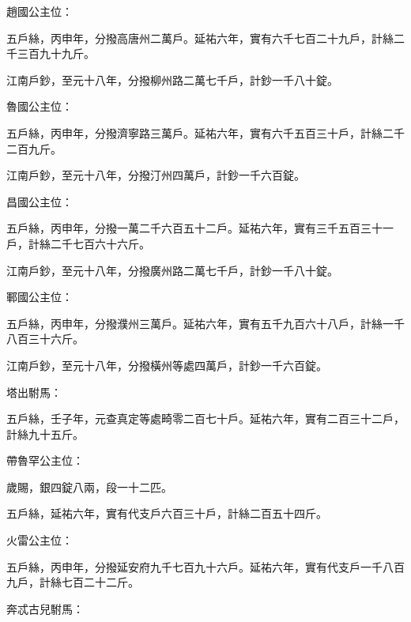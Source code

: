 \begin{pinyinscope}
 趙國公主位：



 五戶絲，丙申年，分撥高唐州二萬戶。延祐六年，實有六千七百二十九戶，計絲二千三百九十九斤。



 江南戶鈔，至元十八年，分撥柳州路二萬七千戶，計鈔一千八十錠。



 魯國公主位：



 五戶絲，丙申年，分撥濟寧路三萬戶。延祐六年，實有六千五百三十戶，計絲二千二百九斤。



 江南戶鈔，至元十八年，分撥汀州四萬戶，計鈔一千六百錠。



 昌國公主位：



 五戶絲，丙申年，分撥一萬二千六百五十二戶。延祐六年，實有三千五百三十一戶，計絲二千七百六十六斤。



 江南戶鈔，至元十八年，分撥廣州路二萬七千戶，計鈔一千八十錠。



 鄆國公主位：



 五戶絲，丙申年，分撥濮州三萬戶。延祐六年，實有五千九百六十八戶，計絲一千八百三十六斤。



 江南戶鈔，至元十八年，分撥橫州等處四萬戶，計鈔一千六百錠。



 塔出駙馬：



 五戶絲，壬子年，元查真定等處畸零二百七十戶。延祐六年，實有二百三十二戶，計絲九十五斤。



 帶魯罕公主位：



 歲賜，銀四錠八兩，段一十二匹。



 五戶絲，延祐六年，實有代支戶六百三十戶，計絲二百五十四斤。



 火雷公主位：



 五戶絲，丙申年，分撥延安府九千七百九十六戶。延祐六年，實有代支戶一千八百九戶，計絲七百二十二斤。



 奔忒古兒駙馬：




\end{pinyinscope}
